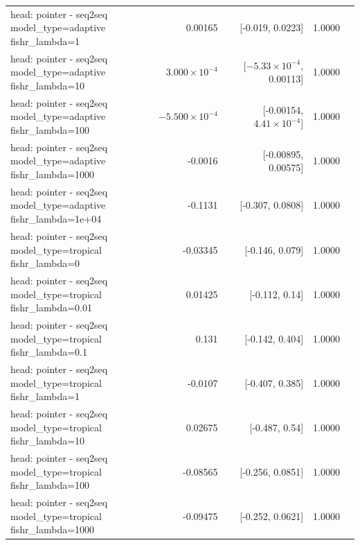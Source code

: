 \documentclass[10pt]{article}
\makeatletter
\newcommand{\stackcell}[1]{\begin{tabular}[t]{@{}l@{}}#1\end{tabular}}
\makeatother
\begin{document}
{\begin{longtable}{lrrrl}
\stackcell{head: pointer - seq2seq\\\footnotesize model\_type=adaptive fishr\_lambda=1 } & 0.00165 & [-0.019, 0.0223] & 1.0000 & \\
\stackcell{head: pointer - seq2seq\\\footnotesize model\_type=adaptive fishr\_lambda=10 } & $3.000\times10^{-4}$ & [$-5.33\times10^{-4}$, 0.00113] & 1.0000 & \\
\stackcell{head: pointer - seq2seq\\\footnotesize model\_type=adaptive fishr\_lambda=100 } & $-5.500\times10^{-4}$ & [-0.00154, $4.41\times10^{-4}$] & 1.0000 & \\
\stackcell{head: pointer - seq2seq\\\footnotesize model\_type=adaptive fishr\_lambda=1000 } & -0.0016 & [-0.00895, 0.00575] & 1.0000 & \\
\stackcell{head: pointer - seq2seq\\\footnotesize model\_type=adaptive fishr\_lambda=1e+04 } & -0.1131 & [-0.307, 0.0808] & 1.0000 & \\
\stackcell{head: pointer - seq2seq\\\footnotesize model\_type=tropical fishr\_lambda=0 } & -0.03345 & [-0.146, 0.079] & 1.0000 & \\
\stackcell{head: pointer - seq2seq\\\footnotesize model\_type=tropical fishr\_lambda=0.01 } & 0.01425 & [-0.112, 0.14] & 1.0000 & \\
\stackcell{head: pointer - seq2seq\\\footnotesize model\_type=tropical fishr\_lambda=0.1 } & 0.131 & [-0.142, 0.404] & 1.0000 & \\
\stackcell{head: pointer - seq2seq\\\footnotesize model\_type=tropical fishr\_lambda=1 } & -0.0107 & [-0.407, 0.385] & 1.0000 & \\
\stackcell{head: pointer - seq2seq\\\footnotesize model\_type=tropical fishr\_lambda=10 } & 0.02675 & [-0.487, 0.54] & 1.0000 & \\
\stackcell{head: pointer - seq2seq\\\footnotesize model\_type=tropical fishr\_lambda=100 } & -0.08565 & [-0.256, 0.0851] & 1.0000 & \\
\stackcell{head: pointer - seq2seq\\\footnotesize model\_type=tropical fishr\_lambda=1000 } & -0.09475 & [-0.252, 0.0621] & 1.0000 & \\

\end{longtable}}
\end{document}
